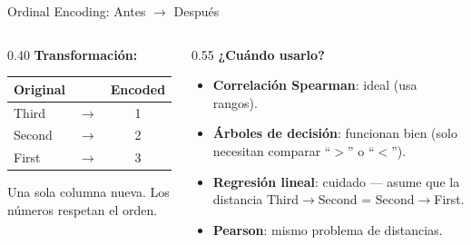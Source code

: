 \documentclass[aspectratio=169, 11pt]{beamer}
\begin{document}
\begin{frame}[shrink=5]{Ordinal Encoding: Antes $\to$ Después}
  \vspace{-4pt}
  \begin{columns}[T]
    \begin{column}{0.40\textwidth}
      {\footnotesize\bfseries\color{arcaDark} Transformación:}
      \vspace{4pt}

      {\scriptsize
      \begin{tabular}{@{}lcc@{}}
        \toprule
        \textbf{Original} & & \textbf{Encoded} \\
        \midrule
        Third & $\to$ & 1 \\
        Second & $\to$ & 2 \\
        First & $\to$ & 3 \\
        \bottomrule
      \end{tabular}
      }

      \vspace{6pt}
      {\scriptsize\color{arcaDark}
        \faLightbulb\hspace{4pt}
        Una sola columna nueva.
        Los números respetan el orden.}
    \end{column}

    \begin{column}{0.55\textwidth}
      {\footnotesize\bfseries\color{arcaDark} ¿Cuándo usarlo?}
      \vspace{4pt}

      {\scriptsize
      \begin{itemize}\setlength{\itemsep}{4pt}
        \item[{\color{codeGreen}\faCheckCircle}]
          \textbf{Correlación Spearman}: ideal (usa rangos).
        \item[{\color{codeGreen}\faCheckCircle}]
          \textbf{Árboles de decisión}: funcionan bien
          (solo necesitan comparar ``$>$'' o ``$<$'').
        \item[{\color{codeOrange}\faExclamationTriangle}]
          \textbf{Regresión lineal}: cuidado --- asume que la
          distancia Third$\to$Second = Second$\to$First.
        \item[{\color{codeOrange}\faExclamationTriangle}]
          \textbf{Pearson}: mismo problema de distancias.
      \end{itemize}
      }
    \end{column}
  \end{columns}
\end{frame}
\end{document}
